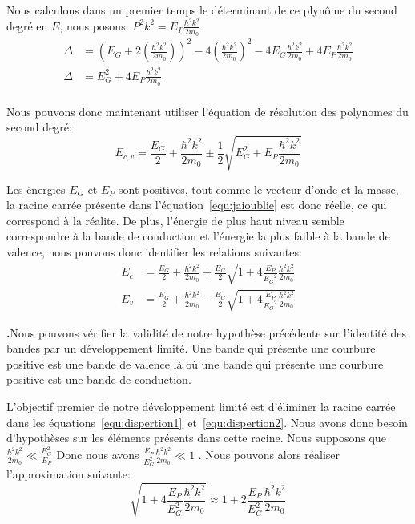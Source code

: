 \documentclass[a4paper,12pt]{article}
\newcounter{numQuestion}
\newcounter{numSubQuestion}
\newcommand{\Question}{%
  \stepcounter{numQuestion}%
  \setcounter{numSubQuestion}{0}%
 \par\noindent \textbf{\arabic{numQuestion}.\hspace{2pt}}}
\begin{document}
Nous calculons dans un premier temps le déterminant de ce plynôme du second degré en $E$, nous posons: $P^2k^2 = E_P \frac{\hbar^2 k^2}{2 m_0}$
\begin{align*}
  \Delta &= \left( E_G + 2\left(\frac{\hbar^2 k^2}{2m_0}\right)\right)^2 -4\left(\frac{\hbar^2k^2}{2m_0}\right)^2 - 4E_G \frac{\hbar^2 k^2}{2m_0} + 4E_P\frac{\hbar^2 k^2}{2m_0} \\
  \Delta &= E_G^2 +4E_P \frac{\hbar^2 k^2}{2m_0} \\
\end{align*}

Nous pouvons donc maintenant utiliser l'équation de résolution des polynomes du second degré:
\begin{equation}\label{equ:jaioublie}
  E_{c,v} = \frac{E_G}{2} + \frac{\hbar^2 k^2}{2m_0} \pm \frac{1}{2}\sqrt{E_G^2 + E_P \frac{\hbar^2k^2}{2 m_0}}
  \end{equation}

Les énergies $E_G$ et $E_P$ sont positives, tout comme le vecteur d'onde et la masse, la racine carrée présente dans l'équation~\ref{equ:jaioublie} est donc réelle, ce qui correspond à la réalite.
De plus, l'énergie de plus haut niveau semble correspondre à la bande de conduction et l'énergie la plus faible à la bande de valence, nous pouvons donc identifier les relations suivantes:
\begin{align}\label{equ:dispertion1}
  E_c &= \frac{E_G}{2} + \frac{\hbar^2 k^2}{2m_0} + \frac{E_G}{2}\sqrt{1 +4 \frac{E_P}{{E_G}^2} \frac{\hbar^2k^2}{2 m_0}}\\ \label{equ:dispertion2}
  E_v &= \frac{E_G}{2} + \frac{\hbar^2 k^2}{2m_0} - \frac{E_G}{2}\sqrt{1 +4 \frac{E_P}{{E_G}^2} \frac{\hbar^2k^2}{2 m_0}}
\end{align}

\Question Nous pouvons vérifier la validité de notre hypothèse précédente sur l'identité des bandes par un développement limité.
Une bande qui présente une courbure positive est une bande de valence là où une bande qui présente une courbure positive est une bande de conduction.

L'objectif premier de notre développement limité est d'éliminer la racine carrée dans les équations~\ref{equ:dispertion1}~et~\ref{equ:dispertion2}. Nous avons donc besoin
d'hypothèses sur les éléments présents dans cette racine. Nous supposons que $\frac{\hbar^2k^2}{2m_0} \ll \frac{E_G^2}{E_P}$ Donc nous avons $\frac{E_P}{E_G^2}\frac{\hbar^2k^2}{2m_0} \ll 1$ . Nous pouvons alors réaliser l'approximation suivante:
\begin{equation}\label{approximation}
  \sqrt{1+4\frac{E_P}{E_G^2} \frac{\hbar^2 k^2}{2 m_0}} \approx 1 + 2\frac{E_P}{E_G^2} \frac{\hbar^2 k^2}{2 m_0}
\end{equation}
\end{document}
